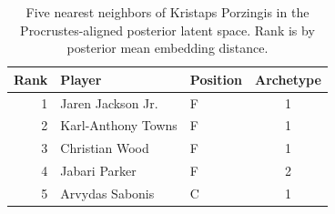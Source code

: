 \begin{table}[htbp]
  \centering\small
  \begin{tabular}{rllc}
    \toprule
    Rank & Player & Position & Archetype \\
    \midrule
    1 & Jaren Jackson Jr. & F & 1 \\
    2 & Karl-Anthony Towns & F & 1 \\
    3 & Christian Wood & F & 1 \\
    4 & Jabari Parker & F & 2 \\
    5 & Arvydas Sabonis & C & 1 \\
    \bottomrule
  \end{tabular}
  \caption{Five nearest neighbors of Kristaps Porzingis in the Procrustes-aligned posterior latent space. Rank is by posterior mean embedding distance.}
  \label{tab:Kristaps_Porzingis_neighbors}
\end{table}

